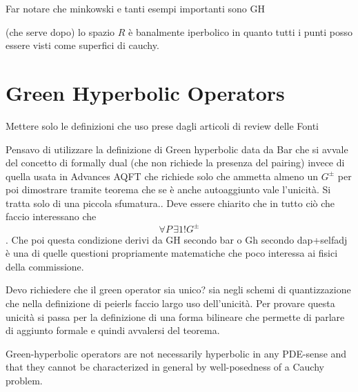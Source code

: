 \documentclass[Main]{subfiles}
\begin{document}
		\begin{Warning}
			Far notare che minkowski e tanti esempi importanti sono GH
		\end{Warning}
		
		\begin{observation}
		(che serve dopo) lo spazio $R$ è banalmente iperbolico in quanto tutti i punti posso essere visti come superfici di cauchy.
		\end{observation}



		\section{Green Hyperbolic Operators}
			\begin{Warning}
				Mettere solo le definizioni che uso prese dagli articoli di review delle Fonti
		\end{Warning}	
					\begin{Warning}
				Pensavo di utilizzare la definizione di Green hyperbolic data da Bar che si avvale del concetto di formally dual (che non richiede la presenza del pairing) invece di quella usata in Advances AQFT che richiede solo che ammetta almeno un $G^\pm$  per poi dimostrare tramite teorema che se è anche autoaggiunto vale l'unicità. Si tratta solo di una piccola sfumatura.. Deve essere chiarito che in tutto ciò che faccio interessano che $$\forall P \, \exists1!G^\pm$$.
				Che poi questa condizione derivi da GH secondo bar o Gh secondo dap+selfadj è una di quelle questioni propriamente matematiche che poco interessa ai fisici della commissione.
			\end{Warning}			
			
			\begin{Warning}
			Devo richiedere che il green operator sia unico? sia negli schemi di quantizzazione che nella definizione di peierls faccio largo uso dell'unicità. 
			Per provare questa unicità si passa per la definizione di una forma bilineare che permette di parlare di aggiunto formale e quindi avvalersi del teorema.
			\end{Warning}
			
		    Green-hyperbolic operators are not necessarily hyperbolic in any PDE-sense and that they cannot be characterized in general by well-posedness of a Cauchy problem. \cite{Terlaky2010} \cite{Bar2010}
		
\end{document}
